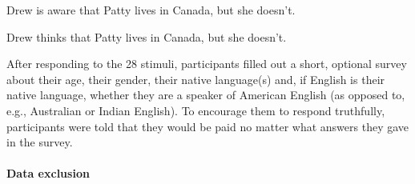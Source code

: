 \documentclass[11pt,fleqn]{article}
\newcommand{\6}{\mbox{$[\hspace*{-.6mm}[$}}
\newcommand{\9}{\mbox{$]\hspace*{-.6mm}]$}}
\begin{document}
{\begin{exe}
\ex\label{train}
\begin{xlist}
\ex Drew is aware that Patty lives in Canada, but she doesn't.

\ex Drew thinks that Patty lives in Canada, but she doesn't.
\end{xlist}
\end{exe}

After responding to the 28 stimuli, participants filled out a short, optional survey about their age, their gender, their native language(s) and, if English is their native language, whether they are a speaker of American English (as opposed to, e.g., Australian or Indian English). To encourage them to respond truthfully, participants were told that they would be paid no matter what answers they gave in the survey.

\paragraph{Data exclusion}

}
\end{document}
